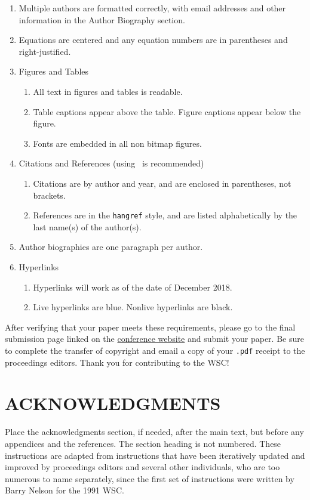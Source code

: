 \documentclass{wscpaperproc}
\theoremstyle{wsc}
\begin{document}
\begin{enumerate}
	\item Multiple authors are formatted correctly, with email addresses and other information in the Author Biography section.
	\item Equations are centered and any equation numbers are in parentheses and right-justified.
	\item Figures and Tables
	\begin{enumerate}
		\item All text in figures and tables is readable.
		\item Table captions appear above the table. Figure captions appear below the figure.
		\item Fonts are embedded in all non bitmap figures.
	\end{enumerate}
	\item Citations and References (using \BibTeX\ is recommended)
	\begin{enumerate}
		\item Citations are by author and year, and are enclosed in parentheses, not brackets.
		\item References are in the {\tt hangref} style, and are listed alphabetically by the last name(s) of the author(s).
	\end{enumerate}
	\item Author biographies are one paragraph per author.
	\item Hyperlinks
	\begin{enumerate}
		\item Hyperlinks will work as of the date of December 2018.
		\item Live hyperlinks are blue. Nonlive hyperlinks are black.		
	\end{enumerate}

\end{enumerate}

After verifying that your paper meets these requirements, please go to the final submission page linked on the \href{http://www.wintersim.org}{conference website} and submit your paper.
Be sure to complete the transfer of copyright and email a copy of your {\tt .pdf} receipt to the proceedings editors. Thank you for contributing to the WSC!

\section*{ACKNOWLEDGMENTS}
Place the acknowledgments section, if needed, after the main text, but before any appendices and the references. The section heading is not numbered. These instructions are adapted from instructions that have been iteratively updated and improved by proceedings editors and several other individuals, who are too numerous to name separately, since the first set of instructions were written by Barry Nelson for the 1991 WSC.
\end{document}
